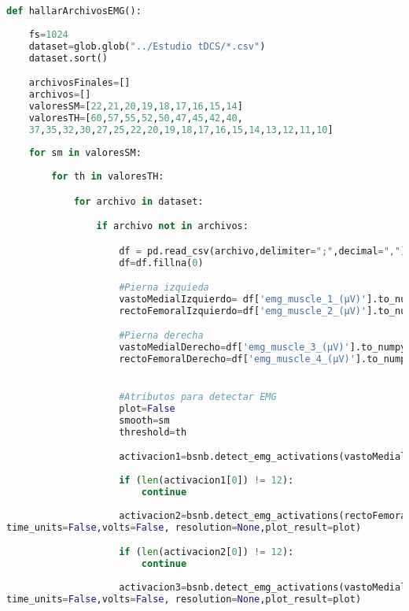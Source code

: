 \begin{lstlisting}[language=Python]
def hallarArchivosEMG():
    
    fs=1024
    dataset=glob.glob("../Estudio tDCS/*.csv")
    dataset.sort()

    archivosFinales=[]
    archivos=[]
    valoresSM=[22,21,20,19,18,17,16,15,14]
    valoresTH=[60,57,55,52,50,47,45,42,40,
    37,35,32,30,27,25,22,20,19,18,17,16,15,14,13,12,11,10]
    
    for sm in valoresSM:
        
        for th in valoresTH:

            for archivo in dataset:

                if archivo not in archivos:

                    df = pd.read_csv(archivo,delimiter=";",decimal=",")
                    df=df.fillna(0)

                    #Pierna izquieda
                    vastoMedialIzquierdo= df['emg_muscle_1_(µV)'].to_numpy()
                    rectoFemoralIzquierdo=df['emg_muscle_2_(µV)'].to_numpy()

                    #Pierna derecha
                    vastoMedialDerecho=df['emg_muscle_3_(µV)'].to_numpy()
                    rectoFemoralDerecho=df['emg_muscle_4_(µV)'].to_numpy()


                    #Atributos para detectar EMG
                    plot=False
                    smooth=sm
                    threshold=th

                    activacion1=bsnb.detect_emg_activations(vastoMedialIzquierdo,fs,smooth_level=smooth, threshold_level=threshold, time_units=False,volts=False, resolution=None,plot_result=plot)
                    
                    if (len(activacion1[0]) != 12):
                        continue
                    
                    activacion2=bsnb.detect_emg_activations(rectoFemoralIzquierdo,fs,smooth_level=smooth, threshold_level=threshold,
time_units=False,volts=False, resolution=None,plot_result=plot)

                    if (len(activacion2[0]) != 12):
                        continue
                    
                    activacion3=bsnb.detect_emg_activations(vastoMedialDerecho,fs,smooth_level=smooth, threshold_level=threshold,
time_units=False,volts=False, resolution=None,plot_result=plot)
                    

\end{lstlisting}
